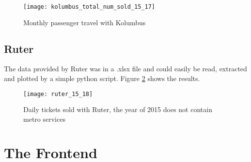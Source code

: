 \begin{figure}[ht]
\texttt{[image: kolumbus\_total\_num\_sold\_15\_17]}
\centering
\caption{Monthly passenger travel with Kolumbus}
\label{fig:kolumbus_15_17}
\end{figure}

\subsection{Ruter}
The data provided by Ruter was in a .xlsx file and could easily be read, extracted and plotted by a simple python script. Figure \ref{fig:ruter_15_18} shows the results.

\begin{figure}[ht]
\texttt{[image: ruter\_15\_18]}
\centering
\caption{Daily tickets sold with Ruter, the year of 2015 does not contain metro services}
\label{fig:ruter_15_18}
\end{figure}


\section{The Frontend}